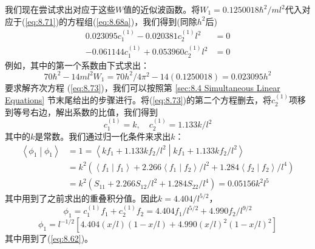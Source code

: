 \begin{examplebox}
        我们现在尝试求出对应于这些$W$值的近似波函数。将$W_1 = 0.1250018\hbar^2/ml^2$代入对应于(\ref{eq:8.71})的方程组(\ref{eq:8.68a})，我们得到(同除$h^2$后)
        \begin{equation}
            \begin{aligned}
                0.023095c_1^{\left(1\right)} - 0.020381c_2^{\left(1\right)}l^2 &= 0 \\
                -0.061144c_1^{\left(1\right)} + 0.053960c_2^{\left(1\right)}l^2 &= 0
            \end{aligned}
            \label{eq:8.73}
        \end{equation}
        例如，其中的第一个系数由下式求出：
        \begin{equation*}
            70\hbar^2 - 14ml^2W_1 = 70h^2/4\pi^2 - 14\left(0.1250018\right) = 0.023095h^2
        \end{equation*}
        要求解齐次方程 (\ref{eq:8.73})，我们可以按照第 \ref{sec:8.4 Simultaneous Linear Equations} 节末尾给出的步骤进行。将(\ref{eq:8.73})的第二个方程删去，将$c_2^{\left(1\right)}$项移到等号右边，解出系数的比值，我们得到
        \begin{equation*}
            c_1^{\left(1\right)} = k, \quad c_2^{\left(1\right)} = 1.133k/l^{2}
        \end{equation*}
        其中的$k$是常数。我们通过归一化条件来求出$k$：
        \begin{equation*}
            \begin{aligned}
                \left\langle \phi_1 \middle| \phi_1 \right\rangle &= 1 = \left\langle kf_1 + 1.133kf_2/l^2 \middle| kf_1 + 1.133kf_2/l^2 \right\rangle \\
                &= k^2\left(\left\langle f_1 \middle| f_1 \right\rangle + 2.266\left\langle f_1 \middle| f_2 \right\rangle /l^2 + 1.284 \left\langle f_2 \middle| f_2 \right\rangle /l^4\right) \\
                &= k^2\left(S_{11} + 2.266S_{12}/l^2 + 1.284S_{22}/l^4\right) = 0.05156 k^2l^5
            \end{aligned}
        \end{equation*}
        其中用到了之前求出的重叠积分值。因此$k = 4.404/l^{5/2}$，
        \begin{equation*}
            \phi_1 = c_1^{\left(1\right)}f_1 + c_2^{\left(1\right)}f_2 = 4.404f_1/l^{5/2} + 4.990f_2/l^{9/2}
        \end{equation*}
        \begin{equation}
            \phi_1 = l^{-1/2}\left[4.404\left(x/l\right)\left(1-x/l\right) + 4.990\left(x/l\right)^2\left(1-x/l\right)^2\right]
            \label{eq:8.74}
        \end{equation}
        其中用到了(\ref{eq:8.62})。


\end{examplebox}
